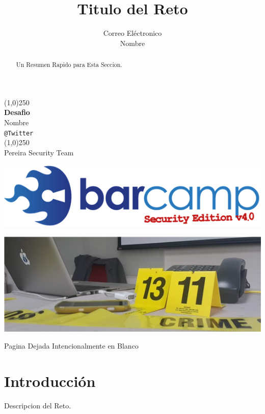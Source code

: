 \documentclass[a4paper]{article}
\title{Titulo del Reto }
\author{Correo El\'ectronico \\Nombre}
\begin{document}
\begin{titlepage} 				
\begin{center}	  				
\vfill
\line(1,0){250}\\ 				%
\huge\textbf{Desafio}\\	
\large{Nombre}\\
\large\texttt{@Twitter}\\
\line(1,0){250}\\
\large{Pereira Security Team}
\end{center}
\vspace{4em}
\centerline{\includegraphics[width=\textwidth]{barcampse_2013_logo-_281_29}} 			%
\vspace{7em}																				%
\centerline{\includegraphics[width=\textwidth]{afr}} 									%


\end{titlepage}
\clearpage
    \thispagestyle{empty}
    \phantom{a}
    \vfill
    \begin{center}Pagina Dejada Intencionalmente en Blanco\end{center}
    \vfill
\newpage
\tableofcontents
\newpage
\clearpage
\begin{abstract}
Un Resumen Rapido para Esta Seccion.
\end{abstract}
\section{Introducci\'on}
Descripcion del Reto.
\end{document}
